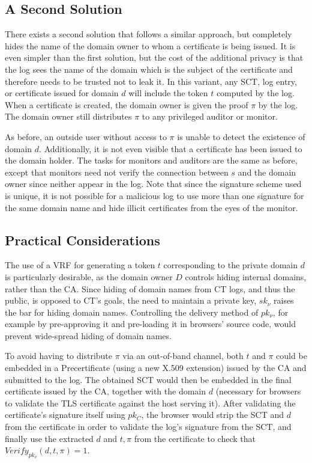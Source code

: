 \documentclass[letterpaper,twocolumn,10pt]{article}
\begin{document}
\subsection{A Second Solution}
There exists a second solution that follows a similar approach, but completely hides the name of the domain owner to whom a certificate is being issued. It is even simpler than the first solution, but the cost of the additional privacy is that the log sees the name of the domain which is the subject of the certificate and therefore needs to be trusted not to leak it. In this variant, any SCT, log entry, or certificate issued for domain $d$ will include the token $t$ computed by the log. When a certificate is created, the domain owner is given the proof $\pi$ by the log. The domain owner still distributes $\pi$ to any privileged auditor or monitor.

As before, an outside user without access to $\pi$ is unable to detect the existence of domain $d$. Additionally, it is not even visible that a certificate has been issued to the domain holder. The tasks for monitors and auditors are the same as before, except that monitors need not verify the connection between $s$ and the domain owner since neither appear in the log. Note that since the signature scheme used is unique, it is not possible for a malicious log to use more than one signature for the same domain name and hide illicit certificates from the eyes of the monitor. 

\subsection{Practical Considerations}
The use of a VRF for generating a token $t$ corresponding to the private domain $d$ is particularly desirable, as the domain owner $D$ controls hiding internal domains, rather than the CA.
Since hiding of domain names from CT logs, and thus the public, is opposed to CT's goals, the need to maintain a private key, $sk_\nu$ raises the bar for hiding domain names. Controlling the delivery method of $pk_\nu$, for example by pre-approving it and pre-loading it in browsers' source code, would prevent wide-spread hiding of domain names.

To avoid having to distribute $\pi$ via an out-of-band channel, both $t$ and $\pi$ could be embedded in a Precertificate (using a new X.509 extension) issued by the CA and submitted to the log. The obtained SCT would then be embedded in the final certificate issued by the CA, together with the domain $d$ (necessary for browsers to validate the TLS certificate against the host serving it).
After validating the certificate's signature itself using $pk_C$, the browser would strip the SCT and $d$ from the certificate in order to validate the log's signature from the SCT, and finally use the extracted $d$ and $t, \pi$ from the certificate to check that $Verify_{pk_\nu}(d,t,\pi)=1$.
\end{document}
